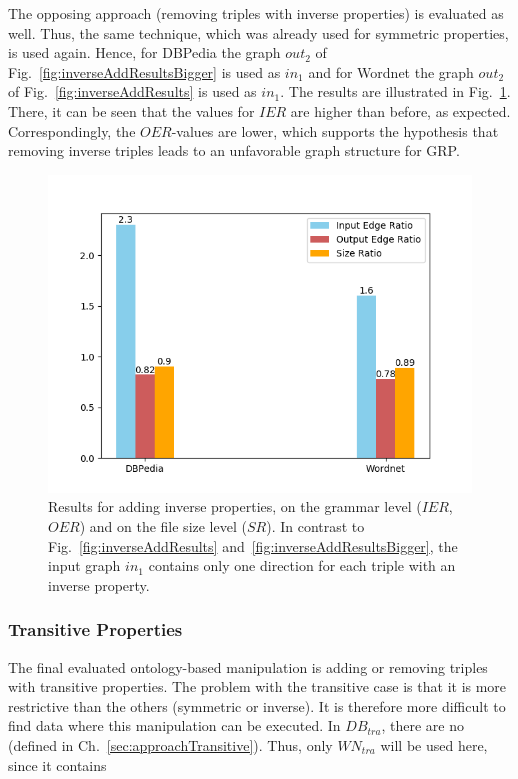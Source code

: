 The opposing approach (removing triples with inverse properties) is evaluated as well. Thus, the same technique, which was already used for symmetric properties, is used again. Hence, for DBPedia the graph $out_2$ of Fig.~\ref{fig:inverseAddResultsBigger} is used as $in_1$ and for Wordnet the graph $out_2$ of Fig.~\ref{fig:inverseAddResults} is used as $in_1$. The results are illustrated in Fig.~\ref{fig:inverseAddResults2}. There, it can be seen that the values for $IER$ are higher than before, as expected. Correspondingly, the $OER$-values are lower, which supports the hypothesis that removing inverse triples leads to an unfavorable graph structure for GRP.

\begin{figure}
	\centering
	\includegraphics[width=0.8\linewidth]{figures/4_evaluation/ontology/ratiosInverseAdd2}
	\caption{Results for adding inverse properties, on the grammar level ($IER$, $OER$) and on the file size level ($SR$). In contrast to Fig.~\ref{fig:inverseAddResults} and~\ref{fig:inverseAddResultsBigger}, the input graph $in_1$ contains only one direction for each triple with an inverse property.}
	\label{fig:inverseAddResults2}
\end{figure}

\subsubsection{Transitive Properties}

The final evaluated ontology-based manipulation is adding or removing triples with transitive properties. The problem with the transitive case is that it is more restrictive than the others (symmetric or inverse). It is therefore more difficult to find data where this manipulation can be executed. In $DB_{tra}$, there are no \tps (defined in Ch.~\ref{sec:approachTransitive}). Thus, only $WN_{tra}$ will be used here, since it contains \tpsp

